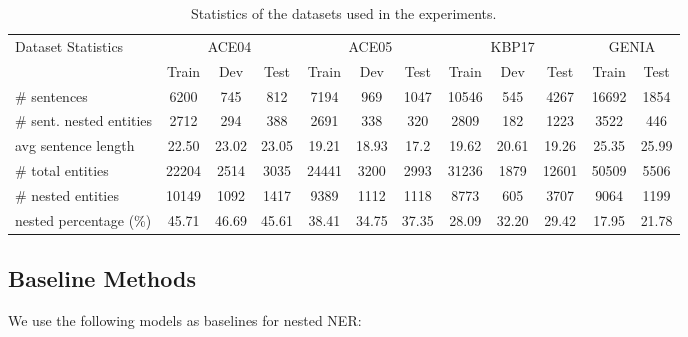 \documentclass[11pt,a4paper]{article}
\begin{document}
\begin{table*}[!t]
\centering
\small
\begin{tabular}{lccccccccccc}
\toprule
\multirow{2}{*}{Dataset Statistics}   & \multicolumn{3}{c}{ACE04}& \multicolumn{3}{c}{ACE05} & \multicolumn{3}{c}{KBP17} & \multicolumn{2}{c}{GENIA}  \\
 \cmidrule(lr){2-4}  \cmidrule(lr){5-7} \cmidrule(lr){8-10} \cmidrule(lr){11-12}  
& Train  & Dev & Test & Train  & Dev & Test & Train  & Dev & Test & Train   & Test  \\
\midrule
\# sentences &  6200 &  745 &  812 &  7194 &  969 &  1047 &  10546 &  545 & 4267 &  16692 &   1854 \\
\# sent. nested entities  &  2712 &  294 &  388 &  2691 &  338 &  320 &  2809 &  182 &  1223 &  3522 &   446 \\
avg sentence length &  22.50 &  23.02 &  23.05 &  19.21 &  18.93 &  17.2 &  19.62 &  20.61 &  19.26 &  25.35 &    25.99 \\
\# total entities &  22204 &  2514 &  3035 &  24441 &  3200 &  2993 &  31236 &  1879 &  12601 &  50509 &    5506 \\
\# nested entities &  10149 &  1092 & 1417  & 9389 &  1112 &  1118 &  8773 &  605 &  3707 &  9064 &    1199 \\
nested percentage (\%) &  45.71 & 46.69 &  45.61 & 38.41 & 34.75 &  37.35 &  28.09 & 32.20 &  29.42 &  17.95 &    21.78 \\
\bottomrule


\end{tabular}
\caption{Statistics of the datasets used in the experiments.}
\label{tab:statistics}
\end{table*}

\subsection{Baseline Methods}
We use the following models as baselines for nested NER:
\end{document}
